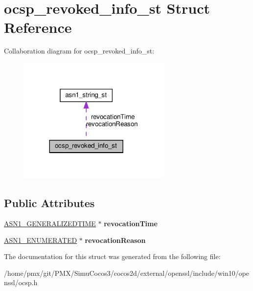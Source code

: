 \hypertarget{structocsp__revoked__info__st}{}\section{ocsp\+\_\+revoked\+\_\+info\+\_\+st Struct Reference}
\label{structocsp__revoked__info__st}


Collaboration diagram for ocsp\+\_\+revoked\+\_\+info\+\_\+st\+:
\nopagebreak
\begin{figure}[H]
\begin{center}
\leavevmode
\includegraphics[width=215pt]{structocsp__revoked__info__st__coll__graph}
\end{center}
\end{figure}
\subsection*{Public Attributes}
\begin{DoxyCompactItemize}
\item 
\mbox{\label{structocsp__revoked__info__st_af95cc4676f07ed0d45dfbe2c4b851902}} 
\hyperlink{structasn1__string__st}{A\+S\+N1\+\_\+\+G\+E\+N\+E\+R\+A\+L\+I\+Z\+E\+D\+T\+I\+ME} $\ast$ {\bfseries revocation\+Time}
\item 
\mbox{\label{structocsp__revoked__info__st_a07edd6ecff783b2ad3e0ecf143fdddc3}} 
\hyperlink{structasn1__string__st}{A\+S\+N1\+\_\+\+E\+N\+U\+M\+E\+R\+A\+T\+ED} $\ast$ {\bfseries revocation\+Reason}
\end{DoxyCompactItemize}


The documentation for this struct was generated from the following file\+:\begin{DoxyCompactItemize}
\item 
/home/pmx/git/\+P\+M\+X/\+Simu\+Cocos3/cocos2d/external/openssl/include/win10/openssl/ocsp.\+h\end{DoxyCompactItemize}
